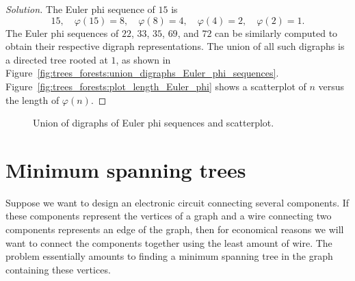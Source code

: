 \begin{proof}[Solution]
The Euler phi sequence of $15$ is
\[
15,\quad
\varphi(15) = 8,\quad
\varphi(8) = 4,\quad
\varphi(4) = 2,\quad
\varphi(2) = 1.
\]
The Euler phi sequences of $22$, $33$, $35$,
$69$, and $72$ can be similarly computed to obtain their respective
digraph representations. The union of all such
digraphs is a directed tree rooted at $1$, as shown in
Figure~\ref{fig:trees_forests:union_digraphs_Euler_phi_sequences}.
Figure~\ref{fig:trees_forests:plot_length_Euler_phi} shows a
scatterplot of $n$ versus the length of
$\varphi(n)$.
\end{proof}

\begin{figure}[!htbp]
\centering
{}
\subfigure[]{
\label{fig:trees_forests:union_digraphs_Euler_phi_sequences}

}
\quad
\subfigure[]{
\label{fig:trees_forests:plot_length_Euler_phi}

}
\caption{Union of digraphs of Euler phi sequences and scatterplot.}
\label{fig:trees_forests:union_digraphs_scatterplot}
\end{figure}



\section{Minimum spanning trees}

Suppose we want to design an electronic
circuit connecting several components. If
these components represent the vertices of a graph and a wire
connecting two components represents an edge of the graph, then for
economical reasons we will want to connect the components together
using the least amount of wire. The problem essentially amounts to
finding a minimum spanning tree in the
graph containing these vertices.

